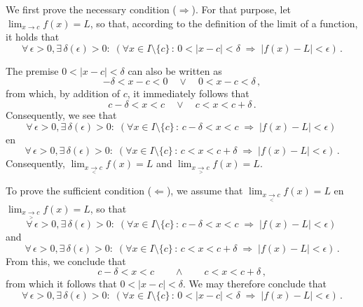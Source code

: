 \begin{Answer}
We first prove the necessary condition ($\Rightarrow$). For that purpose, let $\lim_{x\to c}f(x) = L$, so that, according to the definition of the limit of a function, it holds that
$$
 \forall\,\epsilon > 0, \exists \, \delta(\epsilon) > 0  : \; \left(\forall x\in I\setminus\{c\}\,:\,
0<|x - c| < \delta \; \Rightarrow \; |f(x) - L| < \epsilon\right)\,.$$

The premise $0<|x - c| < \delta$ can also be written as
$$
-\delta<x - c < 0\quad\vee\quad0<x-c<\delta\,,
$$
from which, by addition of $c$, it immediately follows that
$$
c-\delta<x  < c\quad\vee\quad c<x<c+\delta\,.
$$
Consequently, we see that
$$
\forall\,\epsilon > 0, \exists \, \delta(\epsilon) > 0  : \; \left(\forall x\in I\setminus\{c\}\,:\,
c-\delta<x <c \; \Rightarrow \; |f(x) - L| < \epsilon\right)\,$$
en
$$
 \forall\,\epsilon > 0, \exists \, \delta(\epsilon) > 0  : \; \left(\forall x\in I\setminus\{c\}\,:\,
c<x <c+ \delta \; \Rightarrow \; |f(x) - L| < \epsilon\right)\,.$$
Consequently, $\lim_{x\underset{<}{\rightarrow}c}f(x) = L$ and $\lim_{x\underset{>}{\rightarrow}c}f(x) = L.$

To prove the sufficient condition ($\Leftarrow$), we assume that $\lim_{x\underset{<}{\rightarrow}c}f(x) = L$ en $\lim_{x\underset{>}{\rightarrow}c}f(x) = L$, so that
$$
 \forall\,\epsilon > 0, \exists \, \delta(\epsilon) > 0  : \; \left(\forall x\in I\setminus\{c\}\,:\,
c-\delta<x <c \; \Rightarrow \; |f(x) - L| < \epsilon\right)\,$$
and
$$
 \forall\,\epsilon > 0, \exists \, \delta(\epsilon) > 0  : \; \left(\forall x\in I\setminus\{c\}\,:\,
c<x <c+ \delta \; \Rightarrow \; |f(x) - L| < \epsilon\right)\,.$$
From this, we conclude that
$$
c-\delta<x <c \qquad\wedge\qquad c<x <c+ \delta\,,
$$
from which it follows that $0<|x-c|<\delta$. We may therefore conclude that 
$$
 \forall\,\epsilon > 0, \exists \, \delta(\epsilon) > 0  : \; \left(\forall x\in I\setminus\{c\}\,:\,
0<|x - c| < \delta \; \Rightarrow \; |f(x) - L| < \epsilon\right)\,.$$
\end{Answer}


